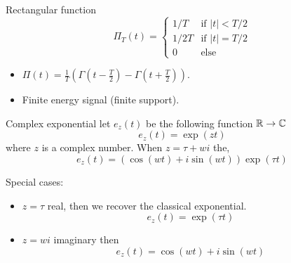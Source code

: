 \begin{block}{Rectangular function}
  \begin{equation}
   \Pi_T (t)=
   \begin{cases}
     1/T& \text{if } |t|< T/2\\
     1/2T& \text{if } |t|= T/2\\
     0& \text{else}
   \end{cases}
   \label{eq:rectangular}
 \end{equation}
 \begin{itemize}
 \item $\Pi(t)=\frac{1}{T}(\Gamma(t-\frac{T}{2})-\Gamma(t+\frac{T}{2}))$.
 \item Finite energy signal (finite support).
 \end{itemize}
   \end{block}


   \begin{block}{Complex exponential }
    let $e_z(t)$ be the following function $\mathbb{R} \rightarrow \mathbb{C}$
 \begin{equation}
   \label{eq:expcomplexe}
   e_z(t)=\exp(zt)
 \end{equation}
 where $z$ is a complex number.
 When $z=\tau+wi$ the, 
 \begin{equation*}
   \label{eq:expcomplexe2}
   e_z(t)=(\cos(wt)+i\sin(wt))\exp(\tau t)
 \end{equation*}
 
 
 Special cases:
 \begin{itemize}
 \item $z=\tau$ real, then we recover the classical exponential.
 $$e_z(t)=\exp(\tau t)$$
 
 \item $z=wi$ imaginary then
 $$e_z(t)=\cos(wt)+i\sin(wt) $$
 
 \end{itemize}
   \end{block}

